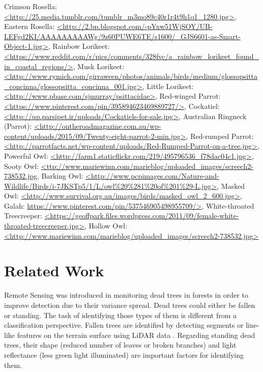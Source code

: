 \documentclass{subfiles}
\begin{document}
{{    	Crimson Rosella: \url{<http://25.media.tumblr.com/tumblr_m3mo89c40r1r4t9h1o1_1280.jpg>},
    	Eastern Rosella: \url{<http://2.bp.blogspot.com/-pYxw51WjSOY/UB-LEFgd2KI/AAAAAAAAAWg/9z60PUWE6TE/s1600/_GJS6601-as-Smart-Object-1.jpg>},
    	Rainbow Lorikeet: \url{<https://www.reddit.com/r/pics/comments/328fvc/a_rainbow_lorikeet_found_in_coastal_regions/>},     	Musk Lorikeet: \url{<http://www.rymich.com/girraween/photos/animals/birds/medium/glossopsitta_concinna/glossopsitta_concinna_001.jpg>},     	Little Lorikeet: \url{<http://www.pbase.com/sjmurray/psittacidae>},     	Red-winged Parrot: \url{<https://www.pinterest.com/pin/395894623469889727/>}, Cockatiel: \url{<http://up.parsipet.ir/uploads/Cockatiels-for-sale.jpg>},     	Australian Ringneck (Parrot): \url{<http://ontheroadmagazine.com.au/wp-content/uploads/2015/09/Twenty-eight-parrot-2-min.jpg>},     	Red-rumped Parrot: \url{<http://parrotfacts.net/wp-content/uploads/Red-Rumped-Parrot-on-a-tree.jpg>},     	Powerful Owl: \url{<http://farm1.staticflickr.com/219/495796536_f78dac04c1.jpg>},     	Sooty Owl: \url{<ttp://www.mariewinn.com/marieblog/uploaded_images/screech2-738532.jpg},     	Barking Owl: \url{<http://www.pcpimages.com/Nature-and-Wildlife/Birds/i-7JKSTp5/1/L/owl\%20\%281\%20of\%201\%29-L.jpg>},     	Masked Owl: \url{<http://www.survival.org.au/images/birds/masked_owl_2_600.jpg>},  	Galah: \url{https://www.pinterest.com/pin/537546905498955709/>},   	White-throated Treecreeper: \url{<https://geoffpark.files.wordpress.com/2011/09/female-white-throated-treecreeper.jpg>}, Hollow Owl: \url{<http://www.mariewinn.com/marieblog/uploaded_images/screech2-738532.jpg>} }
}





\section{Related Work}

\par Remote Sensing was introduced in monitoring dead trees in forests in order to improve detection due to their variance spread. Dead trees could either be fallen or standing. The task of identifying those types of them is different from a classification perspective. Fallen trees are identified by detecting segments or line-like features on the terrain surface using LiDAR data \cite{Polewski2015} \cite{Mucke2013}. Regarding standing dead trees, their shape (reduced number of leaves or broken branches) \cite{Yao2012} and light reflectance (less green light illuminated) \cite{Pasher2009} are important factors for identifying them.
\end{document}
